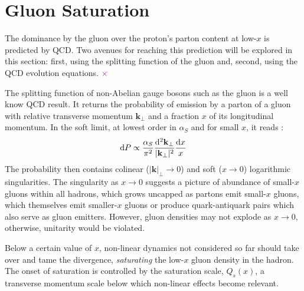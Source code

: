 \section{Gluon Saturation}
\label{sec:gluon_saturation}


The dominance by the gluon over the proton's parton content  at low-$x$ is predicted by \gls{QCD}. Two avenues for reaching this prediction will be explored in this section: first, using the splitting function of the gluon and, second, using the \gls{QCD} evolution equations.
\textcolor{purple}{$\times$}%

The splitting function of non-Abelian gauge bosons such as the gluon is a well know \gls{QCD} result. It returns the probability of emission by a parton of a gluon with relative transverse momentum $\mathbf{k}_\perp$ and a fraction $x$ of its longitudinal momentum. In the soft limit, at lowest order in $\alpha_S$ and for small $x$, it reads \cite{Gelis_2010}:
\begin{equation}
	\mathop{}\!\mathrm{d} P \propto \frac{\alpha_S}{\pi^2} \frac{\mathop{}\!\mathrm{d}^2 \mathbf{k}_\perp}{|\mathbf{k}_\perp|^2} \frac{\mathop{}\!\mathrm{d} x}{x}
\end{equation}
The probability then contains colinear ($|\mathbf{k}|_\perp \to 0$) and soft ($x \to 0$) logarithmic singularities. The singularity as $x \to 0$ suggests a picture of abundance of small-$x$ gluons within all hadrons, which grows uncapped as partons emit small-$x$ gluons, which themselves emit smaller-$x$ gluons or produce quark-antiquark pairs which also serve as gluon emitters. However, gluon densities may not explode as $x \to 0$, otherwise, unitarity would be violated. \cite{Albacete_2014}

Below a certain value of $x$, non-linear dynamics not considered so far should take over and tame the divergence, \textit{saturating} the low-$x$ gluon density in the hadron. The onset of saturation is controlled by the saturation scale, $Q_s(x)$, a transverse momentum scale below which non-linear effects become relevant. \cite{Albacete_2014}

